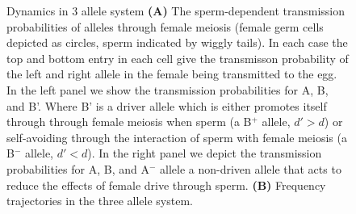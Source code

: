 \documentclass[12pt,letterpaper]{article}
\begin{document}
\begin{figure}
\caption{Dynamics in 3 allele system
{\bf (A) } The sperm-dependent transmission probabilities of alleles through
female meiosis (female germ cells depicted as circles, sperm indicated by wiggly
tails). In each case the top and bottom entry in each cell give the
transmisson probability of the left and right allele in the female
being transmitted to the egg. In the left panel we show the transmission probabilities for
  A, B, and B'. Where B' is a driver allele which is either promotes
  itself through through female meiosis when sperm (a B$^+$ allele,
  $d'>d$) or self-avoiding through the interaction of sperm with female meiosis (a B$^-$ allele,
$d'<d$). In the right panel we depict the transmission probabilities for
  A, B, and A$^-$ allele a non-driven allele that acts to reduce the
  effects of female drive through sperm.
{\bf (B)} Frequency trajectories in the three allele system. }
 \label{Eggsperm_3_allele_cartoon}
\end{figure}


\end{document}
